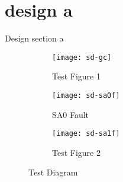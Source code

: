 \section{design a}
\label{sect:design-a}
Design section a

\begin{figure}[H]
  \centering
  \begin{subfigure}[b]{0.5\textwidth}
    \texttt{[image: sd-gc]}
    \caption{Test Figure 1}
    \label{fig:sd-gc}
  \end{subfigure}  
  
  \begin{subfigure}[b]{0.25\textwidth}
    \texttt{[image: sd-sa0f]}
    \caption{SA0 Fault}
    \label{fig:sd-sa0f}
  \end{subfigure}  
  \begin{subfigure}[b]{0.25\textwidth}
    \texttt{[image: sd-sa1f]}
    \caption{Test Figure 2}
    \label{fig:sd-sa1f}
  \end{subfigure}  

  \caption[Test Diagram]{Test Diagram \cite{VanDeGoor1991}}
  \label{fig:sd-sc}
\end{figure}
